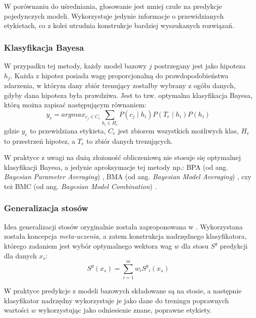 W porównaniu do uśredniania, głosowanie jest mniej czułe na predykcje pojedynczych modeli. Wykorzystuje jedynie informacje o przewidzianych etykietach, \linebreak co z kolei utrudnia konstrukcje bardziej wyszukanych rozwiązań.

\subsubsection{Klasyfikacja Bayesa}

W przypadku tej metody, każdy model bazowy $j$ postrzegany jest jako hipoteza $h_j$. Każda z hipotez posiada wagę proporcjonalną do prawdopodobieństwa zdarzenia, w którym dany zbiór trenujący zostałby wybrany z ogółu danych, gdyby dana hipoteza była prawdziwa. Jest to tzw. optymalna klasyfikacja Bayesa, którą można zapisać następującym równaniem:
\begin{equation}
y_e = arg max_{c_j \in C_e} \sum_{h_i \in H_e} P(c_j \mid h_i)P(T_e \mid h_i)P(h_i)
\end{equation}
gdzie $y_e$ to przewidziana etykieta, $C_e$ jest zbiorem wszystkich możliwych klas, $H_e$ \linebreak to przestrzeń hipotez, a $T_e$ to zbiór danych trenujących.

W praktyce z uwagi na dużą złożoność obliczeniową nie stosuje się optymalnej klasyfikacji Bayesa, a jedynie aproksymacje tej metody np.: BPA (od ang. \textit{Bayesian Parameter Averaging}) \cite{BPA}, BMA (od ang. \textit{Bayesian Model Averaging}) \cite{BMA}, czy też BMC (od ang. \textit{Bayesian Model Combination}) \cite{BMC}.

\subsubsection{Generalizacja stosów}
Idea generalizacji stosów oryginalnie została zaproponowana w \cite{Wolpert92stackedgeneralization}. Wykorzystana została koncepcja \textit{meta-uczenia}, a zatem konstrukcja nadrzędnego klasyfikatora, którego zadaniem jest wybór optymalnego wektora wag $w$ dla stosu $S^g$ predykcji dla danych $x_s$:
\begin{equation}
S^g(x_s) = \sum_{i=1}^{m}w_i {S^g}_i(x_s)
\end{equation}

W praktyce predykcje z modeli bazowych składowane są na stosie, a następnie klasyfikator nadrzędny wykorzystuje je jako dane do treningu poprawnych wartości $w$ wykorzystując jako odniesienie znane, poprawne etykiety.

    
